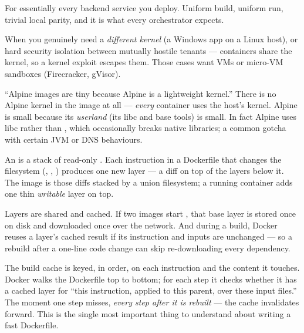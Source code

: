  For essentially every backend service you deploy. Uniform build, uniform run, trivial local parity, and it is what every orchestrator expects.

 When you genuinely need a \emph{different kernel} (a Windows app on a Linux host), or hard security isolation between mutually hostile tenants --- containers share the kernel, so a kernel exploit escapes them. Those cases want VMs or micro-VM sandboxes (Firecracker, gVisor).

\begin{misconception}
``Alpine images are tiny because Alpine is a lightweight kernel.'' There is no Alpine kernel in the image at all --- \emph{every} container uses the host's kernel. Alpine is small because its \emph{userland} (its libc and base tools) is small. In fact Alpine uses  libc rather than , which occasionally breaks native libraries; a common gotcha with certain JVM or DNS behaviours.
\end{misconception}


 An  is a stack of read-only . Each instruction in a Dockerfile that changes the filesystem (, , ) produces one new layer --- a diff on top of the layers below it. The image is those diffs stacked by a union filesystem; a running container adds one thin \emph{writable} layer on top.

 Layers are shared and cached. If two images start , that base layer is stored once on disk and downloaded once over the network. And during a build, Docker reuses a layer's cached result if its instruction and inputs are unchanged --- so a rebuild after a one-line code change can skip re-downloading every dependency.

 The build cache is keyed, in order, on each instruction and the content it touches. Docker walks the Dockerfile top to bottom; for each step it checks whether it has a cached layer for ``this instruction, applied to this parent, over these input files.'' The moment one step misses, \emph{every step after it is rebuilt} --- the cache invalidates forward. This is the single most important thing to understand about writing a fast Dockerfile.


